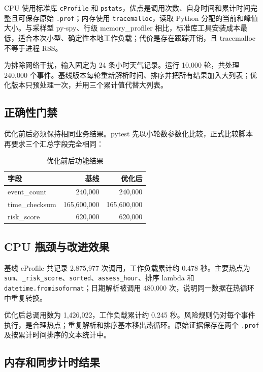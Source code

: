 \documentclass[UTF8,zihao=-4,a4paper]{ctexart}
\newcommand{\code}[1]{\texttt{#1}}
\begin{document}
CPU 使用标准库 \code{cProfile} 和 \code{pstats}，优点是调用次数、自身时间和累计时间完整且可保存原始 \code{.prof}；内存使用 \code{tracemalloc}，读取 Python 分配的当前和峰值大小\cite{python-profile,python-tracemalloc}。与采样型 py-spy、行级 memory\_profiler 相比，标准库工具安装成本最低，适合本次小型、确定性本地工作负载；代价是存在跟踪开销，且 tracemalloc 不等于进程 RSS。

为排除网络干扰，输入固定为 24 条小时天气记录。运行 10,000 轮，共处理 240,000 个事件。基线版本每轮重新解析时间、排序并把所有结果加入大列表；优化版本只预处理一次，并用三个累计值代替大列表。

\subsection{正确性门禁}

优化前后必须保持相同业务结果。pytest 先以小轮数参数化比较，正式比较脚本再要求三个汇总字段完全相同：

\begin{table}[htbp]
\centering
\caption{优化前后功能结果}
\begin{tabular}{lrr}
\toprule
字段 & 基线 & 优化后 \\
\midrule
event\_count & 240,000 & 240,000 \\
time\_checksum & 165,600,000 & 165,600,000 \\
risk\_score & 620,000 & 620,000 \\
\bottomrule
\end{tabular}
\end{table}

\subsection{CPU 瓶颈与改进效果}

基线 cProfile 共记录 2,875,977 次调用，工作负载累计约 0.478 秒。主要热点为 \code{sum}、\code{\_risk\_score}、\code{sorted}、\code{assess\_hour}、排序 lambda 和 \code{datetime.fromisoformat}；日期解析被调用 480,000 次，说明同一数据在热循环中重复转换。

优化后总调用数为 1,426,022，工作负载累计约 0.245 秒。风险规则仍对每个事件执行，是合理热点；重复解析和排序基本移出热循环。原始证据保存在两个 \code{.prof} 及按累计时间排序的文本统计中。

\subsection{内存和同步计时结果}
\end{document}
